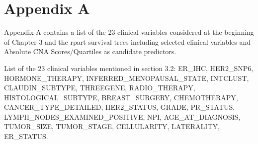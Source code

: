 \renewcommand{\thefigure}{A\arabic{figure}}
\renewcommand{\thetable}{A\arabic{table}}
\setcounter{figure}{0}
\setcounter{table}{0}


\section*{Appendix A}
{}


Appendix A contains a list of the 23 clinical variables considered at the beginning of Chapter 3 and 
the rpart survival trees including selected clinical variables and Absolute CNA Scores/Quartiles as candidate predictors.

List of the 23 clinical variables mentioned in section 3.2: ER\_IHC, HER2\_SNP6, HORMONE\_THERAPY, INFERRED\_MENOPAUSAL\_STATE, INTCLUST, CLAUDIN\_SUBTYPE, THREEGENE, RADIO\_THERAPY, HISTOLOGICAL\_SUBTYPE, BREAST\_SURGERY, CHEMOTHERAPY, CANCER\_TYPE\_DETAILED, HER2\_STATUS, GRADE, PR\_STATUS, LYMPH\_NODES\_EXAMINED\_POSITIVE, NPI, AGE\_AT\_DIAGNOSIS, TUMOR\_SIZE, TUMOR\_STAGE, CELLULARITY, LATERALITY, ER\_STATUS.

